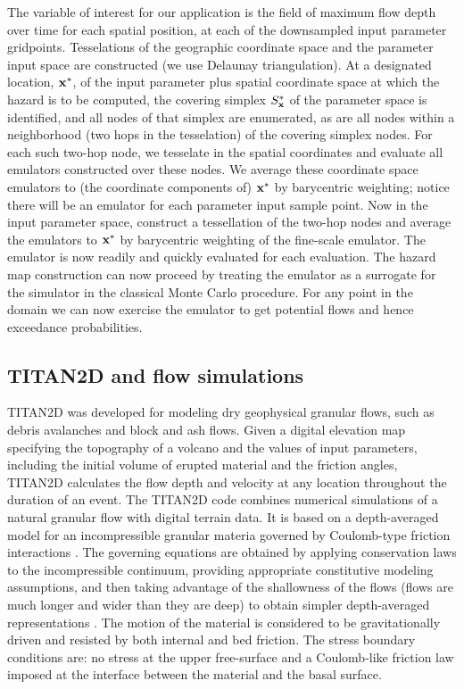 \documentclass{article}
\begin{document}
The variable of interest for our application is the field of maximum
flow depth over time for each spatial position, at each of the
downsampled input parameter gridpoints.  Tesselations of the
geographic coordinate space and the parameter input space are
constructed (we use Delaunay triangulation).  At a designated
location, ${\bf x}^*$, of the input parameter plus spatial coordinate
space at which the hazard is to be computed, the covering simplex
$S_{\bf x}^* $ of the parameter space is identified, and all nodes of
that simplex are enumerated, as are all nodes within a neighborhood
(two hops in the tesselation) of the covering simplex nodes.  For each
such two-hop node, we tesselate in the spatial coordinates and
evaluate all emulators constructed over these nodes.  We average these
coordinate space emulators to (the coordinate components of) ${\bf
  x}^*$ by barycentric weighting; notice there will be an emulator for
each parameter input sample point. Now in the input parameter space,
construct a tessellation of the two-hop nodes and average the
emulators to ${\bf x}^*$ by barycentric weighting of the fine-scale
emulator.  The emulator is now readily and quickly evaluated for each
evaluation. The hazard map construction can now proceed by treating
the emulator as a surrogate for the simulator in the classical Monte
Carlo procedure.  For any point in the domain we can now exercise the
emulator to get potential flows and hence exceedance probabilities.


\subsection{TITAN2D and flow simulations}

TITAN2D was developed for modeling dry geophysical granular flows,
such as debris avalanches and block and ash flows.  Given a digital
elevation map specifying the topography of a volcano and the values of
input parameters, including the initial volume of erupted material and
the friction angles, TITAN2D calculates the flow depth and velocity at
any location throughout the duration of an event.  The TITAN2D code
combines numerical simulations of a natural granular flow with digital
terrain data. It is based on a depth-averaged model for an
incompressible granular materia governed by Coulomb-type friction
interactions \citep{Savage1989}.  The governing equations are obtained
by applying conservation laws to the incompressible continuum,
providing appropriate constitutive modeling assumptions, and then
taking advantage of the shallowness of the flows (flows are much
longer and wider than they are deep) to obtain simpler depth-averaged
representations \citep{Patra2005}. The motion of the material is
considered to be gravitationally driven and resisted by both internal
and bed friction. The stress boundary conditions are: no stress at the
upper free-surface and a Coulomb-like friction law imposed at the
interface between the material and the basal surface.
\end{document}
